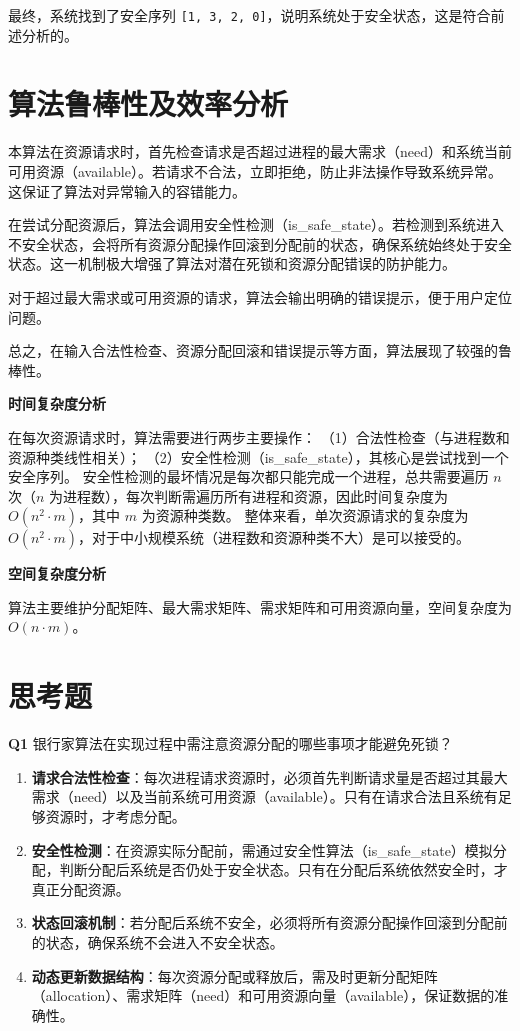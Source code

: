 \documentclass[12pt, a4paper, oneside]{ctexart}
\begin{document}
最终，系统找到了安全序列 \texttt{[1, 3, 2, 0]}，说明系统处于安全状态，这是符合前述分析的。

\section{算法鲁棒性及效率分析}

本算法在资源请求时，首先检查请求是否超过进程的最大需求（need）和系统当前可用资源（available）。若请求不合法，立即拒绝，防止非法操作导致系统异常。这保证了算法对异常输入的容错能力。

在尝试分配资源后，算法会调用安全性检测（is\_safe\_state）。若检测到系统进入不安全状态，会将所有资源分配操作回滚到分配前的状态，确保系统始终处于安全状态。这一机制极大增强了算法对潜在死锁和资源分配错误的防护能力。

对于超过最大需求或可用资源的请求，算法会输出明确的错误提示，便于用户定位问题。

总之，在输入合法性检查、资源分配回滚和错误提示等方面，算法展现了较强的鲁棒性。

\textbf{时间复杂度分析}

在每次资源请求时，算法需要进行两步主要操作：
（1）合法性检查（与进程数和资源种类线性相关）；
（2）安全性检测（is\_safe\_state），其核心是尝试找到一个安全序列。
安全性检测的最坏情况是每次都只能完成一个进程，总共需要遍历 $n$ 次（$n$ 为进程数），每次判断需遍历所有进程和资源，因此时间复杂度为 $O(n^2 \cdot m)$，其中 $m$ 为资源种类数。
整体来看，单次资源请求的复杂度为 $O(n^2 \cdot m)$，对于中小规模系统（进程数和资源种类不大）是可以接受的。

\textbf{空间复杂度分析}

算法主要维护分配矩阵、最大需求矩阵、需求矩阵和可用资源向量，空间复杂度为 $O(n \cdot m)$。

\section{思考题}

\textbf{Q1} \quad 银行家算法在实现过程中需注意资源分配的哪些事项才能避免死锁？

\begin{enumerate} 
    \item \textbf{请求合法性检查}：每次进程请求资源时，必须首先判断请求量是否超过其最大需求（need）以及当前系统可用资源（available）。只有在请求合法且系统有足够资源时，才考虑分配。 
    \item \textbf{安全性检测}：在资源实际分配前，需通过安全性算法（is\_safe\_state）模拟分配，判断分配后系统是否仍处于安全状态。只有在分配后系统依然安全时，才真正分配资源。 
    \item \textbf{状态回滚机制}：若分配后系统不安全，必须将所有资源分配操作回滚到分配前的状态，确保系统不会进入不安全状态。 
    \item \textbf{动态更新数据结构}：每次资源分配或释放后，需及时更新分配矩阵（allocation）、需求矩阵（need）和可用资源向量（available），保证数据的准确性。 
\end{enumerate}
\end{document}
